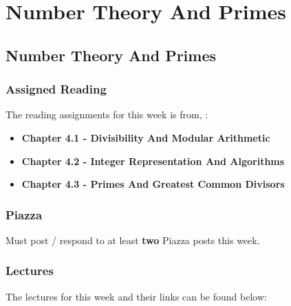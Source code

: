 \clearpage

\renewcommand{\ChapTitle}{Number Theory And Primes}
\renewcommand{\SectionTitle}{Number Theory And Primes}

\chapter{\ChapTitle}
\section{\SectionTitle}

\subsection{Assigned Reading}

The reading assignments for this week is from, \Textbook:

\begin{itemize}
    \item \textbf{Chapter 4.1 - Divisibility And Modular Arithmetic}
    \item \textbf{Chapter 4.2 - Integer Representation And Algorithms}
    \item \textbf{Chapter 4.3 - Primes And Greatest Common Divisors}
\end{itemize}

\subsection{Piazza}

Must post / respond to at least \textbf{two} Piazza posts this week.

\subsection{Lectures}

The lectures for this week and their links can be found below:

